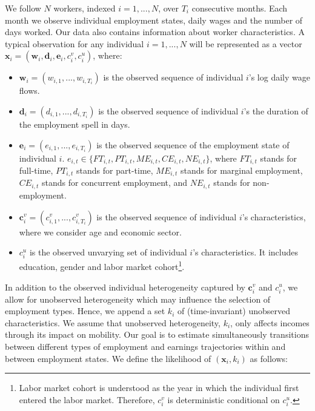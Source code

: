 \documentclass[12pt, a4paper]{article}
\begin{document}
We follow $N$ workers, indexed $i=1,...,N$, over $T_i$ consecutive months. Each month we observe individual employment states, daily wages and the number of days worked. Our data also contains information about worker characteristics. A typical observation for any individual $i=1,...,N$ will be represented as a vector $\textbf{x}_i=(\textbf{w}_i,\textbf{d}_i,\textbf{e}_i,c_i^v,c_i^u)$, where:
\vspace{0.2 cm}
\begin{itemize}
\setlength{\itemsep}{0.2 cm}
\item $\textbf{w}_i=(w_{i,1},...,w_{i,T_i})$ is the observed sequence of individual $i$'s log daily wage flows.
\item $\textbf{d}_i=(d_{i,1},...,d_{i,T_i})$ is the observed sequence of individual $i$'s the duration of the employment spell in days.
\item $\textbf{e}_i=(e_{i,1},...,e_{i,T_i})$ is the observed sequence of the employment state of individual $i$. $e_{i,t}\in\{FT_{i,t},PT_{i,t},ME_{i,t},CE_{i,t},NE_{i,t}\}$, where $FT_{i,t}$ stands for full-time, $PT_{i,t}$ stands for part-time, $ME_{i,t}$ stands for marginal employment, $CE_{i,t}$ stands for concurrent employment, and $NE_{i,t}$ stands for non-employment. 
\item $\textbf{c}_i^v=(c_{i,1}^v,...,c_{i,T_i}^v)$ is the observed sequence of individual $i$'s characteristics, where we consider age and economic sector.
\item $c_i^{u}$ is the observed unvarying set of individual $i$'s characteristics. It includes education, gender and labor market cohort\footnote{Labor market cohort is understood as the year in which the individual first entered the labor market. Therefore, $c_i^v$ is deterministic conditional on $c_i^u$.}.
\end{itemize}
\vspace{0.2 cm}


In addition to the observed individual heterogeneity captured by $\textbf{c}_i^v$ and $c_i^{u}$, we allow for unobserved heterogeneity which may influence the selection of employment types. Hence, we append a set $k_i$ of (time-invariant) unobserved characteristics. We assume that unobserved heterogeneity, $k_i$, only affects incomes through its impact on mobility. Our goal is to estimate simultaneously transitions between different types of employment and earnings trajectories within and between employment states. We define the likelihood of $(\textbf{x}_i,k_i)$ as follows:
\end{document}
